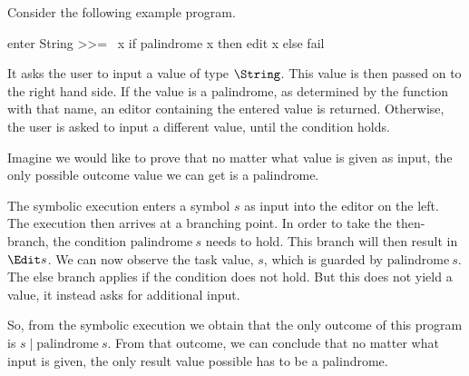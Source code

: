 \begin{example}
Consider the following example program.

\begin{TASK}
  enter String >>= \ x if palindrome x then edit x else fail
\end{TASK}

It asks the user to input a value of type $\String$.
This value is then passed on to the right hand side.
If the value is a palindrome, as determined by the function with that name,
an editor containing the entered value is returned.
Otherwise, the user is asked to input a different value, until the condition holds.

Imagine we would like to prove that no matter what value is given as input,
the only possible outcome value we can get is a palindrome.

The symbolic execution enters a symbol $s$ as input into the editor on the left.
The execution then arrives at a branching point.
In order to take the then-branch, the condition $\text{palindrome}\ s$ needs to hold.
This branch will then result in $\Edit s$.
We can now observe the task value, $s$, which is guarded by $\text{palindrome}\ s$.
The else branch applies if the condition does not hold.
But this does not yield a value, it instead asks for additional input.

So, from the symbolic execution we obtain that the only outcome of this program is $s \mid \text{palindrome}\ s$.
From that outcome, we can conclude that no matter what input is given, the only result value possible has to be a palindrome.
\end{example}
